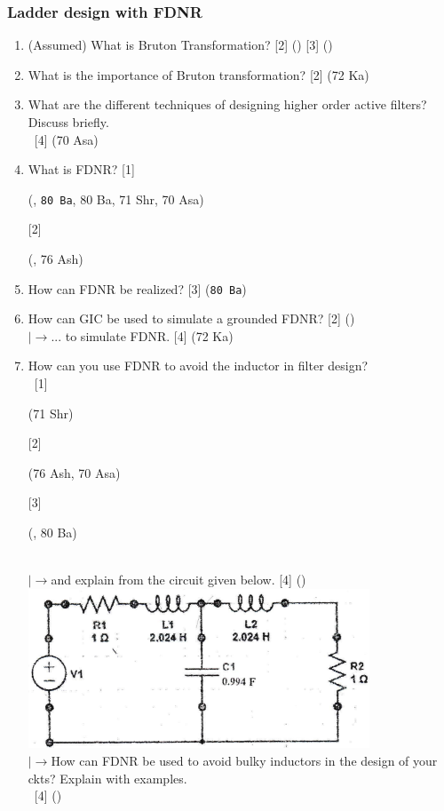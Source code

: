 \documentclass[12pt]{article}
\newcommand{\lb}{\\$\left|\rightarrow\right.$}
\newcommand{\enter}{\\\textcolor{white}{1}}
\begin{document}
		\subsubsection{Ladder design with FDNR}
			\begin{enumerate}
				\item (Assumed) What is Bruton Transformation? \hfill [2] () [3] ()

				\item What is the importance of Bruton transformation? \hfill [2] (72 Ka)

				\item What are the different techniques of designing higher order active filters? Discuss briefly.
				\enter\hfill [4] (70 Asa)			
			
				\item What is FDNR? \hfill [1] \begin{footnotesize} (, \texttt{80 Ba}, 80 Ba, 71 Shr, 70 Asa) \end{footnotesize} [2] \begin{footnotesize} (, 76 Ash) \end{footnotesize} 

				\item How can FDNR be realized? \hfill [3] (\texttt{80 Ba})

				\item How can GIC be used to simulate a grounded FDNR? \hfill [2] ()
				\lb ... to simulate FDNR. \hfill [4] (72 Ka)
				
				\item How can you use FDNR to avoid the inductor in filter design? 
				\enter\hfill [1] \begin{footnotesize} (71 Shr) \end{footnotesize} [2] \begin{footnotesize} (76 Ash, 70 Asa) \end{footnotesize} [3] \begin{footnotesize} (, 80 Ba) \end{footnotesize}
				\lb and explain from the circuit given below. \hfill [4] ()\\
				\includegraphics[width=4in]{./pics/fd_20}
				\lb How can FDNR be used to avoid bulky inductors in the design of your ckts? Explain with examples.
				\enter\hfill [4] ()


\end{enumerate}
\end{document}
